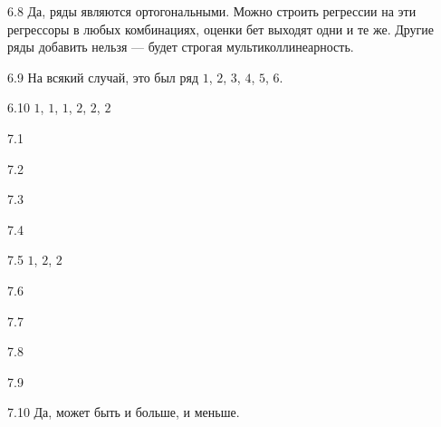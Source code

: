 \protect \hypertarget {soln:6.8}{}
\begin{solution}{{6.8}}
   Да, ряды являются ортогональными. Можно строить регрессии на эти регрессоры в любых комбинациях, оценки бет выходят одни и те же.
   Другие ряды добавить нельзя — будет строгая мультиколлинеарность.
 
\end{solution}
\protect \hypertarget {soln:6.9}{}
\begin{solution}{{6.9}}
     На всякий случай, это был ряд $1$, $2$, $3$, $4$, $5$, $6$.
   
\end{solution}
\protect \hypertarget {soln:6.10}{}
\begin{solution}{{6.10}}
   $1$, $1$, $1$, $2$, $2$, $2$
   
\end{solution}
\protect \hypertarget {soln:7.1}{}
\begin{solution}{{7.1}}
\end{solution}
\protect \hypertarget {soln:7.2}{}
\begin{solution}{{7.2}}

\end{solution}
\protect \hypertarget {soln:7.3}{}
\begin{solution}{{7.3}}

\end{solution}
\protect \hypertarget {soln:7.4}{}
\begin{solution}{{7.4}}

\end{solution}
\protect \hypertarget {soln:7.5}{}
\begin{solution}{{7.5}}
$1$, $2$, $2$
\end{solution}
\protect \hypertarget {soln:7.6}{}
\begin{solution}{{7.6}}
\end{solution}
\protect \hypertarget {soln:7.7}{}
\begin{solution}{{7.7}}
\end{solution}
\protect \hypertarget {soln:7.8}{}
\begin{solution}{{7.8}}
\end{solution}
\protect \hypertarget {soln:7.9}{}
\begin{solution}{{7.9}}
\end{solution}
\protect \hypertarget {soln:7.10}{}
\begin{solution}{{7.10}}
Да, может быть и больше, и меньше.
\end{solution}
